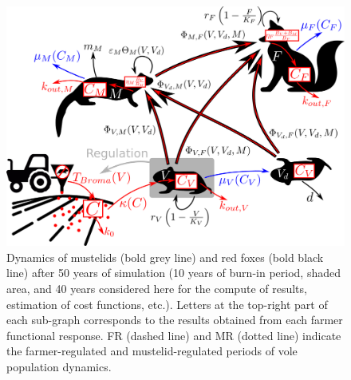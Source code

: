 \documentclass[11pt]{article}
\begin{document}
\begin{figure}
	\begin{center}
		\includegraphics[width=.8\linewidth]{img/system_scheme.png}
		\caption{Dynamics of mustelids (bold grey line) and red foxes (bold black line) after 50 years of simulation (10 years of burn-in period, shaded area, and 40 years considered here for the compute of results, estimation of 
			cost functions, etc.). Letters at the top-right part of each sub-graph corresponds to the results obtained from each farmer functional response. FR (dashed line) and MR (dotted line) indicate the farmer-regulated and mustelid-regulated periods of vole population dynamics.}
		\label{fig:scheme}
	\end{center}
\end{figure}


\end{document}
